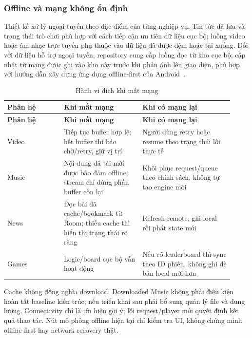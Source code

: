 \subsubsection{Offline và mạng không ổn định}
\label{sec:offline-design}

Thiết kế xử lý ngoại tuyến theo đặc điểm của từng nghiệp vụ. Tin tức đã lưu và trạng thái trò chơi phù hợp với cách tiếp cận ưu tiên dữ liệu cục bộ; luồng video hoặc âm nhạc trực tuyến phụ thuộc vào dữ liệu đã được đệm hoặc tải xuống. Đối với dữ liệu hỗ trợ ngoại tuyến, repository cung cấp luồng đọc từ kho cục bộ; cập nhật từ mạng được ghi vào kho này trước khi phản ánh lên giao diện, phù hợp với hướng dẫn xây dựng ứng dụng offline-first của Android~\cite{android-offline-first}.

\begingroup
\small
\renewcommand{\arraystretch}{1.2}
\setlength{\tabcolsep}{3pt}
\begin{longtable}{>{\RaggedRight\arraybackslash}p{0.23\linewidth}>{\RaggedRight\arraybackslash}p{0.32\linewidth}>{\RaggedRight\arraybackslash}p{0.37\linewidth}}
\caption{Hành vi đích khi mất mạng}
\label{tab:offline-behavior}\\
\toprule
\textbf{Phân hệ} & \textbf{Khi mất mạng} & \textbf{Khi có mạng lại} \\
\midrule
\endfirsthead
\toprule
\textbf{Phân hệ} & \textbf{Khi mất mạng} & \textbf{Khi có mạng lại} \\
\midrule
\endhead
\bottomrule
\endfoot
Video & Tiếp tục buffer hợp lệ; hết buffer thì báo chờ/retry, giữ vị trí & Người dùng retry hoặc resume theo trạng thái lỗi thực tế \\
Music & Nội dung đã tải mới được bảo đảm offline; stream chỉ dùng phần buffer còn lại & Khôi phục request/queue theo chính sách, không tự tạo engine mới \\
News & Đọc bài đã cache/bookmark từ Room; thiếu cache thì hiển thị trạng thái rõ ràng & Refresh remote, ghi local rồi phát state mới \\
Games & Logic/board cục bộ vẫn hoạt động & Nếu có leaderboard thì sync theo ID phiên, không ghi đè bản local mới hơn \\
\end{longtable}
\endgroup

Cache không đồng nghĩa download. Downloaded Music không phải điều kiện hoàn tất baseline kiến trúc; nếu triển khai sau phải bổ sung quản lý file và dung lượng. Connectivity chỉ là tín hiệu gợi ý; lỗi request/player mới quyết định kết quả thao tác. Nút mô phỏng offline hiện tại chỉ kiểm tra UI, không chứng minh offline-first hay network recovery thật.

